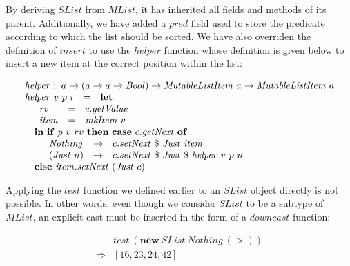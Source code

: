 \documentclass[runningheads,a4paper]{llncs}
\begin{document}
By deriving $\mathit{SList}$ from $\mathit{MList}$, it has inherited all fields and methods of its parent. Additionally, we have added a $\mathit{pred}$ field used to store the predicate according to which the list should be sorted. We have also overriden the definition of $\mathit{insert}$ to use the $\mathit{helper}$ function whose definition is given below to insert a new item at the correct position within the list:

\begin{displaymath}
\begin{array}{lcl}
\multicolumn{3}{l}{\mathit{helper} :: a \to (a \to a \to \mathit{Bool}) \to \mathit{MutableListItem}~a \to \mathit{MutableListItem}~a} \\
\mathit{helper}~v~p~i & = & \mathbf{let} \\
\multicolumn{3}{l}{\quad \begin{array}{lcl}
\mathit{rv} & = & c.\mathit{getValue} \\
\mathit{item} & = & \mathit{mkItem}~v
\end{array}}\\
\multicolumn{3}{l}{\quad \mathbf{in}~\mathbf{if}~p~v~rv~\mathbf{then}~\mathbf{case}~c.\mathit{getNext}~\mathbf{of}} \\
\multicolumn{3}{l}{\quad \quad \begin{array}{lcl}
\mathit{Nothing} & \to & c.\mathit{setNext}~\$~\mathit{Just}~\mathit{item} \\
(\mathit{Just}~n) & \to & c.\mathit{setNext}~\$~\mathit{Just}~\$~\mathit{helper}~v~p~n 
\end{array}} \\
\multicolumn{3}{l}{\quad \mathbf{else}~\mathit{item}.\mathit{setNext}~(\mathit{Just}~c)}
\end{array}
\end{displaymath}

Applying the $\mathit{test}$ function we defined earlier to an $\mathit{SList}$ object directly is not possible. In other words, even though we consider $\mathit{SList}$ to be a subtype of $\mathit{MList}$, an explicit cast must be inserted in the form of a $\mathit{downcast}$ function:

\begin{displaymath}
\begin{array}{cl}
 & \mathit{test}~(\mathbf{new}~\mathit{SList}~\mathit{Nothing}~(>)) \\
\Rightarrow & [16,23,24,42]
\end{array}
\end{displaymath}   
\end{document}
